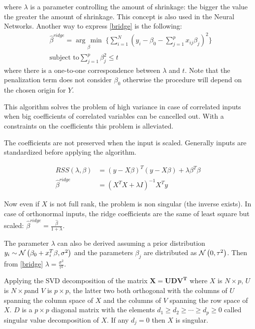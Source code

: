 \documentclass[12pt, letterpaper]{article}
\theoremstyle{definition}
\newcommand{\argmin}[1]{\underset{#1}{\operatorname{arg}\,\operatorname{min}}\;}
\begin{document}
where $\lambda$ is a parameter controlling the amount of shrinkage: the bigger the value the greater the amount of shrinkage. This concept is also used in the Neural Networks. Another way to express \autoref{bridge} is the following:
\begin{equation}
\begin{aligned}
&\hat{\beta}^{ridge} = \argmin{\beta} \Bigg\lbrace \sum_{i=1}^N \left( y_i -  \beta_0 - \sum_{j=1}^p x_{ij} \beta_j\right)^2 \Bigg\rbrace\\
&\text{subject to} \sum_{j=1}^p \beta_j^2 \le t
\end{aligned}
\end{equation}
where there is a one-to-one correspondence between $\lambda$ and $t$. Note that the penalization term does not consider $\beta_0$ otherwise the procedure will depend on the chosen origin for $Y$.

This algorithm solves the problem of high variance in case of correlated inputs when big coefficients of correlated variables can be cancelled out. With a constraints on the coefficients this problem is alleviated.

The coefficients are not preserved when the input is scaled. Generally inputs are standardized before applying the algorithm.

\begin{align}
RSS(\lambda, \beta)       &= \left( y - X \beta \right)^T \left( y - X\beta \right) + \lambda \beta^T \beta \\
\hat{\beta}^{ridge} &= \left( X^TX + \lambda I \right)^{-1} X^Ty
\end{align}

Now even if $X$ is not full rank, the problem is non singular (the inverse exists).
In case of orthonormal inputs, the ridge coefficients are the same of least square but scaled: $\hat{\beta}^{ridge}  = \frac{\hat{\beta}}{1+\lambda}$.

The parameter $\lambda$ can also be derived assuming a prior distribution $y_i  \sim  \CMcal{N}\left( \beta_0+x_i^T\beta, \sigma^2\right)$ and the parameters $\beta_j$ are distributed as $\CMcal{N}\left( 0, \tau^2\right)$. Then from \autoref{bridge} $\lambda = \frac{\sigma^2}{\tau^2}$.

Applying the SVD decomposition of the matrix $\mathbf{X =  UDV^T}$ where $X$ is $N\times p$, $U$ is $N\times p$and $V$ is $p\times p$, the latter two both orthogonal with the columns of $U$ spanning the column space of $X$ and the columns of $V$ spanning the row space of $X$. $D$ is a $p\times p$ diagonal matrix with the elements $d_1\ge d_2 \ge \cdots \ge d_p\ge 0$ called singular value decomposition of $X$. If any $d_j = 0$ then $X$ is singular.
\end{document}
